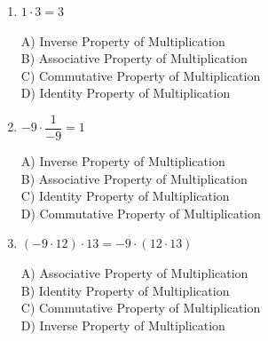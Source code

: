 \documentclass[11pt]{article}
\begin{document}
\begin{enumerate}
\begin{minipage}{\linewidth}
\end{minipage}
  \vspace{0.3cm}
  \item $1 \cdot 3 = 3$
\\[2pt]
\begin{minipage}{\linewidth}
A) Inverse Property of Multiplication \\
B) Associative Property of Multiplication \\
C) Commutative Property of Multiplication \\
D) Identity Property of Multiplication
\end{minipage}
  \vspace{0.3cm}
  \item $-9 \cdot \dfrac{1}{-9} = 1$
\\[2pt]
\begin{minipage}{\linewidth}
A) Inverse Property of Multiplication \\
B) Associative Property of Multiplication \\
C) Identity Property of Multiplication \\
D) Commutative Property of Multiplication
\end{minipage}
  \vspace{0.3cm}
  \item $(-9 \cdot 12) \cdot 13 = -9 \cdot (12 \cdot 13)$
\\[2pt]
\begin{minipage}{\linewidth}
A) Associative Property of Multiplication \\
B) Identity Property of Multiplication \\
C) Commutative Property of Multiplication \\
D) Inverse Property of Multiplication
\end{minipage}
  \vspace{0.3cm}
\end{enumerate}
\end{document}
